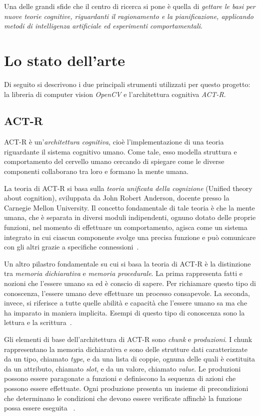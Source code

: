 	Una delle grandi sfide che il centro di ricerca si pone è quella di \emph{gettare le basi per nuove teorie cognitive, riguardanti il ragionamento e la pianificazione, applicando metodi di intelligenza artificiale ed esperimenti comportamentali}.

 

	\section*{Lo stato dell'arte}
	Di seguito si descrivono i due principali strumenti utilizzati per questo progetto: la libreria di computer vision \emph{\mbox{OpenCV}} e l'architettura cognitiva \mbox{\emph{ACT-R}}.
		
			\subsection*{ACT-R}
				\mbox{ACT-R} è un'\emph{architettura cognitiva}, cioè l'implementazione di una teoria riguardante il sistema cognitivo umano. Come tale, esso modella struttura e comportamento del cervello umano cercando di spiegare come le diverse componenti collaborano tra loro e formano la mente umana.
				
				La teoria di \mbox{ACT-R} si basa sulla \emph{teoria unificata della cognizione} (Unified theory about cognition), sviluppata da John Robert Anderson, docente presso la Carnegie Mellon University. Il concetto fondamentale di tale teoria è che la mente umana, che è separata in diversi moduli indipendenti, ognuno dotato delle proprie funzioni, nel momento di effettuare un comportamento, agisca come un sistema integrato in cui ciascun componente svolge una precisa funzione e può comunicare con gli altri grazie a specifiche connessioni~\cite{Anderson04anintegrated}.

				Un altro pilastro fondamentale su cui si basa la teoria di \mbox{ACT-R} è la distinzione tra \emph{memoria dichiarativa} e \emph{memoria procedurale}. La prima rappresenta fatti e nozioni che l'essere umano sa ed è conscio di sapere. Per richiamare questo tipo di conoscenza, l'essere umano deve effettuare un processo consapevole. La seconda, invece, si riferisce a tutte quelle abilità e capacità che l'essere umano sa ma che ha imparato in maniera implicita. Esempi di questo tipo di conoscenza sono la lettura e la scrittura~\cite{anderson1976language}. 

				Gli elementi di base dell'architettura di \mbox{ACT-R} sono \emph{chunk} e \emph{produzioni}.
				I chunk rappresentano la memoria dichiarativa e sono delle strutture dati caratterizzate da un tipo, chiamato \emph{type}, e da una lista di coppie, ognuna delle quali è costituita da un attributo, chiamato \emph{slot}, e da un valore, chiamato \emph{value}.
				Le produzioni possono essere paragonate a funzioni e definiscono la sequenza di azioni che possono essere effettuate.
				Ogni produzione presenta un insieme di precondizioni che determinano le condizioni che devono essere verificate affinchè la funzione possa essere eseguita ~\cite{actr6refman}.

